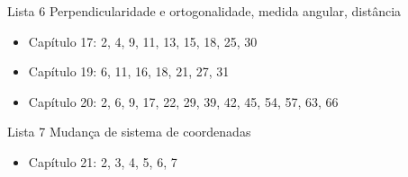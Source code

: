 \begin{frame}{Lista 6}
    Perpendicularidade e ortogonalidade, medida angular, distância
    \begin{itemize}
        \item Capítulo 17: 2, 4, 9, 11, 13, 15, 18, 25, 30
        \item Capítulo 19: 6, 11, 16, 18, 21, 27, 31
        \item Capítulo 20: 2, 6, 9, 17, 22, 29, 39, 42, 45, 54, 57, 63, 66
    \end{itemize}
\end{frame}

\begin{frame}{Lista 7}
    Mudança de sistema de coordenadas
    \begin{itemize}
        \item Capítulo 21: 2, 3, 4, 5, 6, 7
    \end{itemize}
\end{frame}
